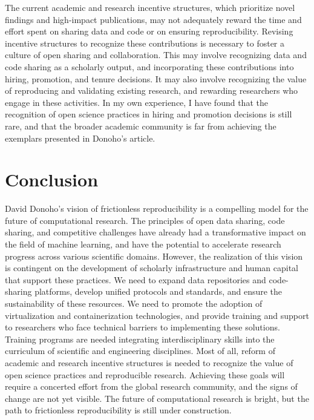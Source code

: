 \documentclass[]{hdsr}
\begin{document}
The current academic and research incentive structures, which prioritize novel findings and high-impact publications, may not adequately reward the time and effort spent on sharing data and code or on ensuring reproducibility. Revising incentive structures to recognize these contributions is necessary to foster a culture of open sharing and collaboration. This may involve recognizing data and code sharing as a scholarly output, and incorporating these contributions into hiring, promotion, and tenure decisions. It may also involve recognizing the value of reproducing and validating existing research, and rewarding researchers who engage in these activities. In my own experience, I have found that the recognition of open science practices in hiring and promotion decisions is still rare, and that the broader academic community is far from achieving the exemplars presented in Donoho's article.

\section*{Conclusion}
David Donoho's vision of frictionless reproducibility is a compelling model for the future of computational research. The principles of open data sharing, code sharing, and competitive challenges have already had a transformative impact on the field of machine learning, and have the potential to accelerate research progress across various scientific domains. However, the realization of this vision is contingent on the development of scholarly infrastructure and human capital that support these practices. We need to expand data repositories and code-sharing platforms, develop unified protocols and standards, and ensure the sustainability of these resources. We need to promote the adoption of virtualization and containerization technologies, and provide training and support to researchers who face technical barriers to implementing these solutions. Training programs are needed integrating interdisciplinary skills into the curriculum of scientific and engineering disciplines. Most of all, reform of academic and research incentive structures is needed to recognize the value of open science practices and reproducible research. Achieving these goals will require a concerted effort from the global research community, and the signs of change are not yet visible. The future of computational research is bright, but the path to frictionless reproducibility is still under construction.


\end{document}
